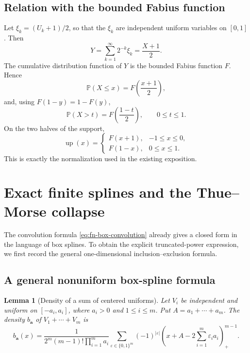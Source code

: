 \documentclass[11pt,oneside]{article}
\newtheorem{lemma}[theorem]{Lemma}
\theoremstyle{definition}
\theoremstyle{remark}
\newcommand{\Prob}{\mathbb P}
\newcommand{\Up}{\operatorname{up}}
\newcommand{\pos}[1]{\left(#1\right)_{+}}
\begin{document}
\subsection{Relation with the bounded Fabius function}

Let $\xi_k=(U_k+1)/2$, so that the $\xi_k$ are independent uniform variables on $[0,1]$.
Then
\begin{equation}
 Y=\sum_{k=1}^{\infty}2^{-k}\xi_k=\frac{X+1}{2}.
 \label{eq:Y-X-relation}
\end{equation}
The cumulative distribution function of $Y$ is the bounded Fabius function $F$.  Hence
\begin{equation}
 \Prob(X\le x)=F\left(\frac{x+1}{2}\right),
 \label{eq:X-cdf-F}
\end{equation}
and, using $F(1-y)=1-F(y)$,
\begin{equation}
 \Prob(X>t)=F\left(\frac{1-t}{2}\right),\qquad 0\le t\le1.
 \label{eq:X-tail-F}
\end{equation}
On the two halves of the support,
\begin{equation}
 \Up(x)=
 \begin{cases}
 F(x+1),&-1\le x\le0,\\
 F(1-x),&0\le x\le1.
 \end{cases}
 \label{eq:up-F-relation}
\end{equation}
This is exactly the normalization used in the existing exposition.

\section{Exact finite splines and the Thue--Morse collapse}
\label{sec:exact-spline}

The convolution formula \eqref{eq:fn-box-convolution} already gives a closed form in the
language of box splines.  To obtain the explicit truncated-power expression, we first
record the general one-dimensional inclusion--exclusion formula.

\subsection{A general nonuniform box-spline formula}

\begin{lemma}[Density of a sum of centered uniforms]
\label{lem:general-box-spline}
Let $V_i$ be independent and uniform on $[-a_i,a_i]$, where $a_i>0$ and
$1\le i\le m$.  Put $A=a_1+\cdots+a_m$.  The density $b_{\bm a}$ of
$V_1+\cdots+V_m$ is
\begin{equation}
 b_{\bm a}(x)=
 \frac{1}{2^m(m-1)!\prod_{i=1}^{m}a_i}
 \sum_{\varepsilon\in\{0,1\}^m}(-1)^{|\varepsilon|}
 \pos{x+A-2\sum_{i=1}^{m}\varepsilon_i a_i}^{m-1}.
 \label{eq:general-box-spline}
\end{equation}
\end{lemma}
\end{document}
